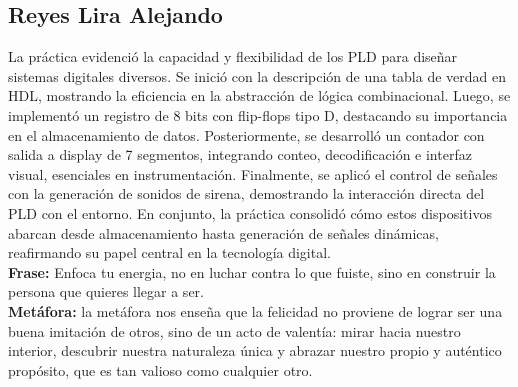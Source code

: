 \subsection*{Reyes Lira Alejando}

    La práctica evidenció la capacidad y flexibilidad de los PLD para diseñar sistemas digitales diversos. Se inició con la descripción de una tabla de verdad en HDL, mostrando la eficiencia en la abstracción de lógica combinacional. Luego, se implementó un registro de 8 bits con flip-flops tipo D, destacando su importancia en el almacenamiento de datos. Posteriormente, se desarrolló un contador con salida a display de 7 segmentos, integrando conteo, decodificación e interfaz visual, esenciales en instrumentación. Finalmente, se aplicó el control de señales con la generación de sonidos de sirena, demostrando la interacción directa del PLD con el entorno. En conjunto, la práctica consolidó cómo estos dispositivos abarcan desde almacenamiento hasta generación de señales dinámicas, reafirmando su papel central en la tecnología digital.\\
    \textcolor{Amarillo}{\textbf{Frase:}} Enfoca tu \textcolor{Amarillo}{energia}, no en luchar contra lo que fuiste, sino en construir la persona que quieres llegar a ser.\\
    \textcolor{Amarillo}{\textbf{Metáfora:}} la metáfora nos enseña que la felicidad no proviene de lograr ser una buena imitación de otros, sino de un acto de valentía: mirar hacia nuestro interior, descubrir nuestra naturaleza única y abrazar nuestro propio y auténtico propósito, que es tan valioso como cualquier otro. 